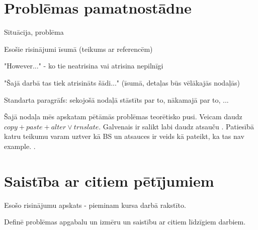 \section{Problēmas pamatnostādne}

Situācija, problēma

Esošie risinājumi īsumā (teikums ar referencēm)

"However..." - ko tie neatrisina vai atrisina nepilnīgi

"Šajā darbā tas tiek atrisināts šādi..." (īsumā, detaļas būs vēlākajās nodaļās)

Standarta paragrāfs: sekojošā nodaļā stāstīts par to, nākamajā par to, ...


Šajā nodaļa mēs apskatam pētāmās problēmas teorētisko pusi.
Veicam daudz $copy + paste + alter \vee trnslate$.
Galvenais ir salikt labi daudz atsauču \cite{kant2018recent}.
Patiesībā katru teikumu varam uztver kā BS un atsauces ir veids kā pateikt, ka tas nav \gls{example}.
.

\section{Saistība ar citiem pētījumiem}

Esošo risinājumu apskats - pieminam kursa darbā rakstīto.

Definē problēmas apgabalu un izmēru un saistību ar citiem līdzīgiem darbiem.  
